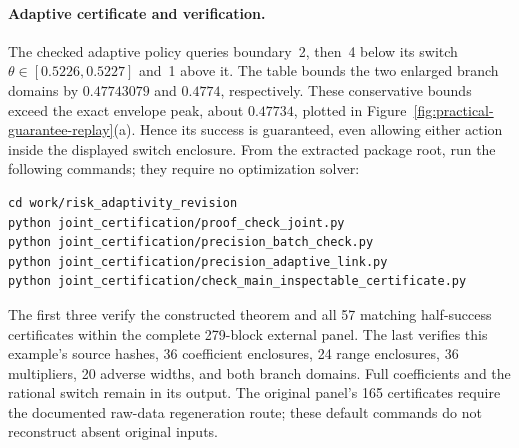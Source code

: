 \documentclass[12pt]{article}
\begin{document}
\paragraph{Adaptive certificate and verification.}
The checked adaptive policy queries boundary~2, then~4 below its switch
$\theta\in[0.5226,0.5227]$ and~1 above it.  The table bounds the two
enlarged branch domains by $0.47743079$ and $0.4774$, respectively.
These conservative bounds exceed the exact envelope peak, about $0.47734$,
plotted in Figure~\ref{fig:practical-guarantee-replay}(a).
Hence its success is guaranteed, even allowing either action inside the
displayed switch enclosure.
From the extracted package root, run the following commands; they require
no optimization solver:
\begin{verbatim}
cd work/risk_adaptivity_revision
python joint_certification/proof_check_joint.py
python joint_certification/precision_batch_check.py
python joint_certification/precision_adaptive_link.py
python joint_certification/check_main_inspectable_certificate.py
\end{verbatim}
The first three verify the constructed theorem and all 57 matching
half-success certificates within the complete 279-block external panel.
The last verifies this example's source hashes, 36 coefficient enclosures,
24 range enclosures, 36 multipliers, 20 adverse widths, and both branch
domains.  Full coefficients and the rational switch remain in its output.
The original panel's 165 certificates require the documented raw-data
regeneration route; these default commands do not reconstruct absent
original inputs.
\end{document}
